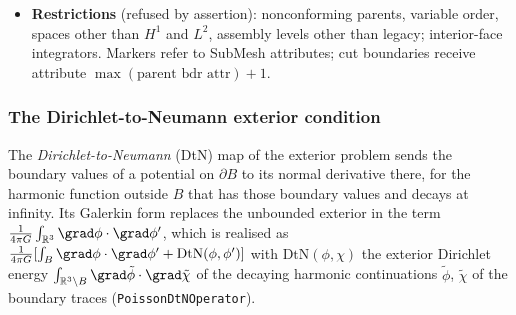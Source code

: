 \documentclass[11pt]{article}
\numberwithin{equation}{section}
\theoremstyle{remark}
\newcommand{\R}{\mathbb{R}}
\newcommand{\DtN}{\mathrm{DtN}}
\newcommand{\code}[1]{\texttt{#1}}
\begin{document}
\begin{itemize}
  lie outside the SubMesh, and the entry is silently lost (already on a
  $4\times4$ quadrilateral mesh, two slab-partitioned processes, order 2).
  Instead $\Pi^T$ is built row by row over \emph{owned SubMesh} true dofs,
  whose owner always holds a SubMesh element containing them, using the
  global parent true-dof number of the corresponding parent local dof.
  $\Pi$ is Boolean, so $\Pi^T$ is at once the exact primal restriction and
  the dual prolongation.
\item \textbf{Restrictions} (refused by assertion): nonconforming parents,
  variable order, spaces other than $H^1$ and $L^2$, assembly levels other
  than legacy; interior-face integrators. Markers refer to SubMesh
  attributes; cut boundaries receive attribute $\max(\text{parent bdr
  attr})+1$.
\end{itemize}

\subsubsection{The Dirichlet-to-Neumann exterior condition}
\label{sec:dtn}

The \emph{Dirichlet-to-Neumann} (DtN) map of the exterior problem sends
the boundary values of a potential on $\partial B$ to its normal derivative
there, for the harmonic function outside $B$ that has those boundary values
and decays at infinity. Its Galerkin form replaces the unbounded exterior
in the term $\frac{1}{4\pi G}\int_{\R^3}\grad\phi\cdot\grad\phi'$, which
is realised as $\frac{1}{4\pi G}[\int_B\grad\phi\cdot\grad\phi' +
\DtN(\phi,\phi')]$ with $\DtN(\phi,\chi)$ the exterior Dirichlet energy
$\int_{\R^3\setminus B}\grad\tilde\phi\cdot\grad\tilde\chi$ of the decaying
harmonic continuations $\tilde\phi$, $\tilde\chi$ of the boundary traces
(\code{PoissonDtNOperator}).
\end{document}
